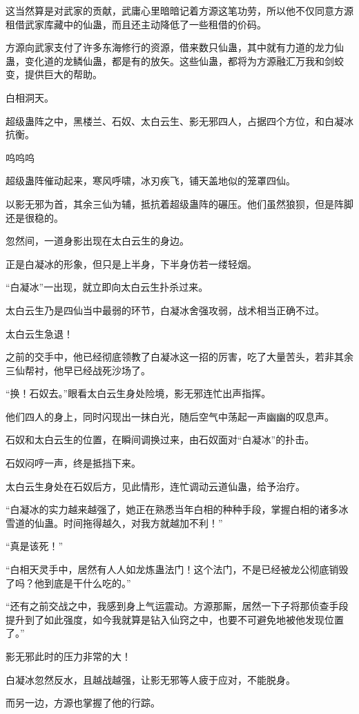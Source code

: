 \begin{this_body}
这当然算是对武家的贡献，武庸心里暗暗记着方源这笔功劳，所以他不仅同意方源租借武家库藏中的仙蛊，而且还主动降低了一些租借的价码。

方源向武家支付了许多东海修行的资源，借来数只仙蛊，其中就有力道的龙力仙蛊，变化道的龙鳞仙蛊，都是有的放矢。这些仙蛊，都将为方源融汇万我和剑蛟变，提供巨大的帮助。

白相洞天。

超级蛊阵之中，黑楼兰、石奴、太白云生、影无邪四人，占据四个方位，和白凝冰抗衡。

呜呜呜

超级蛊阵催动起来，寒风呼啸，冰刃疾飞，铺天盖地似的笼罩四仙。

以影无邪为首，其余三仙为辅，抵抗着超级蛊阵的碾压。他们虽然狼狈，但是阵脚还是很稳的。

忽然间，一道身影出现在太白云生的身边。

正是白凝冰的形象，但只是上半身，下半身仿若一缕轻烟。

“白凝冰”一出现，就立即向太白云生扑杀过来。

太白云生乃是四仙当中最弱的环节，白凝冰舍强攻弱，战术相当正确不过。

太白云生急退！

之前的交手中，他已经彻底领教了白凝冰这一招的厉害，吃了大量苦头，若非其余三仙帮衬，他早已经战死沙场了。

“换！石奴去。”眼看太白云生身处险境，影无邪连忙出声指挥。

他们四人的身上，同时闪现出一抹白光，随后空气中荡起一声幽幽的叹息声。

石奴和太白云生的位置，在瞬间调换过来，由石奴面对“白凝冰”的扑击。

石奴闷哼一声，终是抵挡下来。

太白云生身处在石奴后方，见此情形，连忙调动云道仙蛊，给予治疗。

“白凝冰的实力越来越强了，她正在熟悉当年白相的种种手段，掌握白相的诸多冰雪道的仙蛊。时间拖得越久，对我方就越加不利！”

“真是该死！”

“白相天灵手中，居然有人人如龙炼蛊法门！这个法门，不是已经被龙公彻底销毁了吗？他到底是干什么吃的。”

“还有之前交战之中，我感到身上气运震动。方源那厮，居然一下子将那侦查手段提升到了如此强度，如今我就算是钻入仙窍之中，也要不可避免地被他发现位置了。”

影无邪此时的压力非常的大！

白凝冰忽然反水，且越战越强，让影无邪等人疲于应对，不能脱身。

而另一边，方源也掌握了他的行踪。


\end{this_body}
